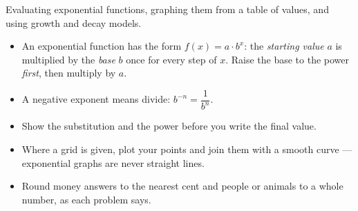\documentclass[12pt]{article}
\begin{document}

\noindent\small
Evaluating exponential functions, graphing them from a table of values, and
using growth and decay models.
\begin{itemize}[leftmargin=0.7cm, itemsep=1pt, topsep=2pt]
  \item An exponential function has the form $f(x) = a \cdot b^{x}$: the
        \emph{starting value} $a$ is multiplied by the \emph{base} $b$ once for
        every step of $x$. Raise the base to the power \emph{first}, then
        multiply by $a$.
  \item A negative exponent means divide: $b^{-n} = \dfrac{1}{b^{n}}$.
  \item Show the substitution and the power before you write the final value.
  \item Where a grid is given, plot your points and join them with a smooth
        curve --- exponential graphs are never straight lines.
  \item Round money answers to the nearest cent and people or animals to a
        whole number, as each problem says.
\end{itemize}
\normalsize
\vspace{0.2cm}



\end{document}
